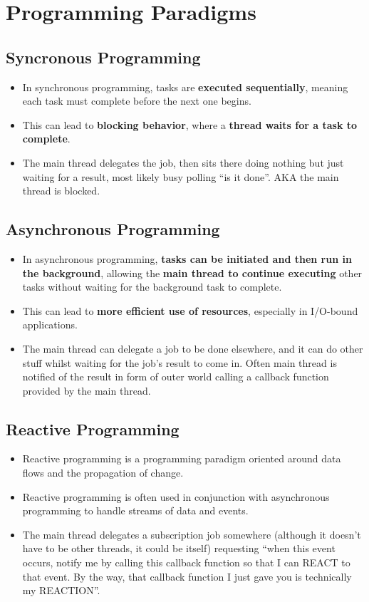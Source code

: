 \documentclass{article}
\begin{document}
\section{Programming Paradigms}
\subsection{Syncronous Programming}
\begin{itemize}
  \item In synchronous programming, tasks are \textbf{executed sequentially}, meaning each task must complete before the next one begins.
  \item This can lead to \textbf{blocking behavior}, where a \textbf{thread waits for a task to complete}.
  \item The main thread delegates the job, then sits there doing nothing but just waiting for a result, most likely busy polling ``is it done''. AKA the main thread is blocked.
\end{itemize}
\subsection{Asynchronous Programming}
\begin{itemize}
  \item In asynchronous programming, \textbf{tasks can be initiated and then run in the background}, allowing the \textbf{main thread to continue executing} other tasks without waiting for the background task to complete.
  \item This can lead to \textbf{more efficient use of resources}, especially in I/O-bound applications.
  \item The main thread can delegate a job to be done elsewhere, and it can do other stuff whilst waiting for the job's result to come in. Often main thread is notified of the result in form of outer world calling a callback function provided by the main thread.
\end{itemize}
\subsection{Reactive Programming}
\begin{itemize}
  \item Reactive programming is a programming paradigm oriented around data flows and the propagation of change.
  \item Reactive programming is often used in conjunction with asynchronous programming to handle streams of data and events.
  \item The main thread delegates a subscription job somewhere (although it doesn't have to be other threads, it could be itself) requesting ``when this event occurs, notify me by calling this callback function so that I can REACT to that event. By the way, that callback function I just gave you is technically my REACTION''.
\end{itemize}
\end{document}
